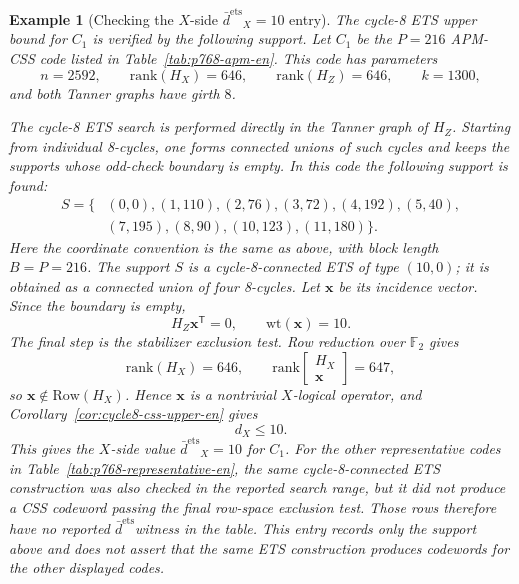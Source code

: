 \documentclass[11pt]{article}
\newcommand{\Ftwo}{\mathbb{F}_2}
\newcommand{\Row}{\mathrm{Row}}
\newcommand{\rank}{\mathrm{rank}}
\newcommand{\wt}{\mathrm{wt}}
\newcommand{\dbound}[1]{\ensuremath{\bar{d}^{\mathrm{#1}}}}
\newcommand{\dets}{\dbound{ets}}
\newcommand{\markededit}[1]{#1}
\newcommand{\vect}[1]{\bm{#1}}
\newcommand{\vx}{\vect{x}}
\theoremstyle{uprightthm}
\newtheorem{example}[theorem]{Example}
\begin{document}
\begin{example}[Checking the $X$-side \texorpdfstring{\(\dets_X=10\)}{dbar-ets-X=10} entry]
\label{ex:ub4-small-en}
The cycle-8 ETS upper bound for $C_1$ is verified by the following support.  Let
$C_1$ be the $P=216$ APM-CSS code listed in Table~\ref{tab:p768-apm-en}.
This code has parameters
\[
n=2592,\qquad \rank(H_X)=646,\qquad \rank(H_Z)=646,\qquad k=1300,
\]
and both Tanner graphs have girth $8$.

The cycle-8 ETS search is performed directly in the Tanner graph of $H_Z$.
Starting from individual 8-cycles, one forms connected unions of such cycles
and keeps the supports whose odd-check boundary is empty.  In this code the
following support is found:
\[
\begin{aligned}
S=\{&(0,0),(1,110),(2,76),(3,72),(4,192),(5,40),\\
    &(7,195),(8,90),(10,123),(11,180)\}.
\end{aligned}
\]
Here the coordinate convention is the same as above, with block length
$B=P=216$.  The support $S$ is a cycle-8-connected ETS of type $(10,0)$; it is
obtained as a connected union of four 8-cycles.  Let $\vx$ be its incidence
vector.  Since the boundary is empty,
\[
H_Z\vx^{\mathsf T}=0,\qquad \wt(\vx)=10.
\]
The final step is the stabilizer exclusion test.  Row reduction over $\Ftwo$
gives
\[
\rank(H_X)=646,\qquad
\rank\!\begin{bmatrix}H_X\\ \vx\end{bmatrix}=647,
\]
so $\vx\notin\Row(H_X)$.  Hence $\vx$ is a nontrivial $X$-logical operator, and
Corollary~\ref{cor:cycle8-css-upper-en} gives
\[
d_X\le 10.
\]
This \markededit{gives} the $X$-side value $\dets_X=10$ for $C_1$.  For the other representative codes in
Table~\ref{tab:p768-representative-en}, the same cycle-8-connected ETS
construction was also checked in the reported search range, but it did not
produce a CSS codeword passing the final row-space exclusion test.  Those rows
therefore have no reported \dets witness in the table.  This entry records only
the \markededit{support above} and does not assert that the same ETS construction
produces codewords for the other displayed codes.
\end{example}
\end{document}
